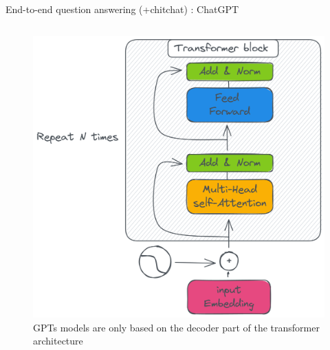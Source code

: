 \documentclass[10pt,aspectratio=169]{beamer}
\begin{document}
\begin{frame}{End-to-end question answering (+chitchat) : ChatGPT}
\begin{columns}
\begin{column}{0.5\textwidth}
\begin{figure}
                \includegraphics[width=.9\textwidth]{media/transformer-block.png}
                \caption{GPTs models are only based on the decoder part of the transformer architecture}
                \label{fig:my_label}
            \end{figure}
        \end{column}
    \end{columns}
\end{frame}
\end{document}
